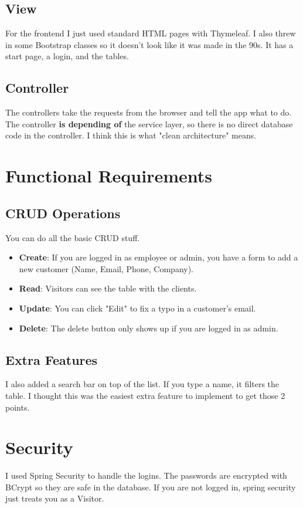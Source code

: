 \documentclass[12pt,a4paper]{article}
\begin{document}
\subsection{View}
For the frontend I just used standard HTML pages with Thymeleaf. I also threw in some Bootstrap classes so it doesn't look like it was made in the 90s. It has a start page, a login, and the tables.

\subsection{Controller}
The controllers take the requests from the browser and tell the app what to do. The controller \textbf{is depending of} the service layer, so there is no direct database code in the controller. I think this is what "clean architecture" means.

\section{Functional Requirements}
\subsection{CRUD Operations}
You can do all the basic CRUD stuff. 
\begin{itemize}
    \item \textbf{Create}: If you are logged in as employee or admin, you have a form to add a new customer (Name, Email, Phone, Company).
    \item \textbf{Read}: Visitors can see the table with the clients.
    \item \textbf{Update}: You can click "Edit" to fix a typo in a customer's email.
    \item \textbf{Delete}: The delete button only shows up if you are logged in as admin.
\end{itemize}

\subsection{Extra Features}
I also added a search bar on top of the list. If you type a name, it filters the table. I thought this was the easiest extra feature to implement to get those 2 points.

\section{Security}
I used Spring Security to handle the logins. The passwords are encrypted with BCrypt so they are safe in the database. If you are not logged in, spring security just treats you as a Visitor.
\end{document}
